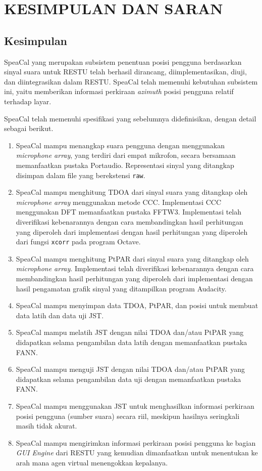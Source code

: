 \chapter{\uppercase{Kesimpulan dan Saran}}
\label{chap:kesimpulan}


\section{Kesimpulan}

SpeaCal yang merupakan subsistem penentuan posisi pengguna berdasarkan sinyal suara untuk RESTU telah berhasil dirancang, diimplementasikan, diuji, dan diintegrasikan dalam RESTU. SpeaCal telah memenuhi kebutuhan subsistem ini, yaitu memberikan informasi perkiraan \textit{azimuth} posisi pengguna relatif terhadap layar.

SpeaCal telah memenuhi spesifikasi yang sebelumnya didefinisikan, dengan detail sebagai berikut.

\begin{enumerate}
\item SpeaCal mampu menangkap suara pengguna dengan menggunakan \textit{microphone array}, yang terdiri dari empat mikrofon, secara bersamaan memanfaatkan pustaka Portaudio. Representasi sinyal yang ditangkap disimpan dalam file yang berekstensi \texttt{raw}.
\item SpeaCal mampu menghitung TDOA dari sinyal suara yang ditangkap oleh \textit{microphone array} menggunakan metode CCC. Implementasi CCC menggunakan DFT memanfaatkan pustaka FFTW3. Implementasi telah diverifikasi kebenarannya dengan cara membandingkan hasil perhitungan yang diperoleh dari implementasi dengan hasil perhitungan yang diperoleh dari fungsi \texttt{xcorr} pada program Octave.
\item SpeaCal mampu menghitung PtPAR dari sinyal suara yang ditangkap oleh \textit{microphone array}. Implementasi telah diverifikasi kebenarannya dengan cara membandingkan hasil perhitungan yang diperoleh dari implementasi dengan hasil pengamatan grafik sinyal yang ditampilkan program Audacity.
\item SpeaCal mampu menyimpan data TDOA, PtPAR, dan posisi untuk membuat data latih dan data uji JST.
\item SpeaCal mampu melatih JST dengan nilai TDOA dan/atau PtPAR yang didapatkan selama pengambilan data latih dengan memanfaatkan pustaka FANN.
\item SpeaCal mampu menguji JST dengan nilai TDOA dan/atau PtPAR yang didapatkan selama pengambilan data uji dengan memanfaatkan pustaka FANN.
\item SpeaCal mampu menggunakan JST untuk menghasilkan informasi perkiraan posisi pengguna (sumber suara) secara riil, meskipun hasilnya seringkali masih tidak akurat.
\item SpeaCal mampu mengirimkan informasi perkiraan posisi pengguna ke bagian \textit{GUI Engine} dari RESTU yang kemudian dimanfaatkan untuk menentukan ke arah mana agen virtual menengokkan kepalanya.
\end{enumerate}

